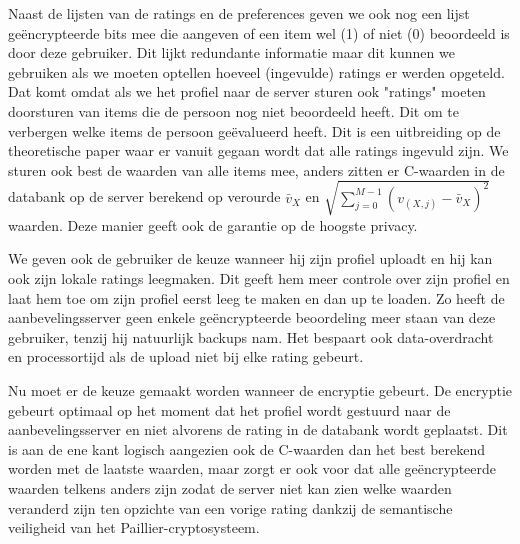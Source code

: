 Naast de lijsten van de ratings en de preferences geven we ook nog een lijst ge\"encrypteerde bits mee die aangeven of een item wel (1) of niet (0) beoordeeld is door deze gebruiker. Dit lijkt redundante informatie maar dit kunnen we gebruiken als we moeten optellen hoeveel (ingevulde) ratings er werden opgeteld.  Dat komt omdat als we het profiel naar de server sturen ook "ratings" moeten doorsturen van items die de persoon nog niet beoordeeld heeft. Dit om te verbergen welke items de persoon ge\"evalueerd heeft. Dit is een uitbreiding op de theoretische paper \cite{ZErkinDyn} waar er vanuit gegaan wordt dat alle ratings ingevuld zijn.  We sturen ook best de waarden van alle items mee, anders zitten er C-waarden in de databank op de server berekend op verourde $\bar{v}_X$ en $\sqrt{\sum_{j=0}^{M-1} (v_{(X,j)} - \bar{v}_X)^2}$ waarden. Deze manier geeft ook de garantie op de hoogste privacy.

We geven ook de gebruiker de keuze wanneer hij zijn profiel uploadt en hij kan ook zijn lokale ratings leegmaken. Dit geeft hem meer controle over zijn profiel en laat hem toe om zijn profiel eerst leeg te maken en dan up te loaden. Zo heeft de aanbevelingsserver geen enkele ge\"encrypteerde beoordeling meer staan van deze gebruiker, tenzij hij natuurlijk backups nam. Het bespaart ook data-overdracht en processortijd als de upload niet bij elke rating gebeurt.

Nu moet er de keuze gemaakt worden wanneer de encryptie gebeurt. De encryptie gebeurt optimaal op het moment dat het profiel wordt gestuurd naar de aanbevelingsserver en niet alvorens de rating in de databank wordt geplaatst. Dit is aan de ene kant logisch aangezien ook de C-waarden dan het best berekend worden met de laatste waarden, maar zorgt er ook voor dat alle ge\"encrypteerde waarden telkens anders zijn zodat de server niet kan zien welke waarden veranderd zijn ten opzichte van een vorige rating dankzij de semantische veiligheid van het Paillier-cryptosysteem.